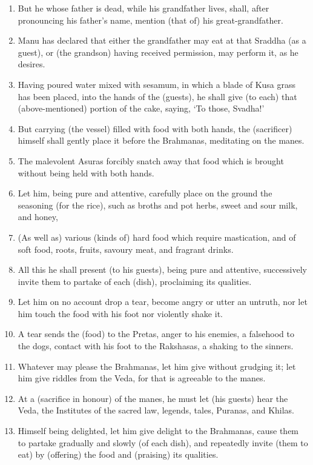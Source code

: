 \begin{enumerate}
\item But he whose father is dead, while his grandfather lives, shall, after pronouncing his father's name, mention (that of) his great-grandfather.
\item Manu has declared that either the grandfather may eat at that Sraddha (as a guest), or (the grandson) having received permission, may perform it, as he desires.
\item Having poured water mixed with sesamum, in which a blade of Kusa grass has been placed, into the hands of the (guests), he shall give (to each) that (above-mentioned) portion of the cake, saying, `To those, Svadha!'
\item But carrying (the vessel) filled with food with both hands, the (sacrificer) himself shall gently place it before the Brahmanas, meditating on the manes.
\item The malevolent Asuras forcibly snatch away that food which is brought without being held with both hands.
\item Let him, being pure and attentive, carefully place on the ground the seasoning (for the rice), such as broths and pot herbs, sweet and sour milk, and honey,
\item (As well as) various (kinds of) hard food which require mastication, and of soft food, roots, fruits, savoury meat, and fragrant drinks.
\item All this he shall present (to his guests), being pure and attentive, successively invite them to partake of each (dish), proclaiming its qualities.
\item Let him on no account drop a tear, become angry or utter an untruth, nor let him touch the food with his foot nor violently shake it.
\item A tear sends the (food) to the Pretas, anger to his enemies, a falsehood to the dogs, contact with his foot to the Rakshasas, a shaking to the sinners.
\item Whatever may please the Brahmanas, let him give without grudging it; let him give riddles from the Veda, for that is agreeable to the manes.
\item At a (sacrifice in honour) of the manes, he must let (his guests) hear the Veda, the Institutes of the sacred law, legends, tales, Puranas, and Khilas.
\item Himself being delighted, let him give delight to the Brahmanas, cause them to partake gradually and slowly (of each dish), and repeatedly invite (them to eat) by (offering) the food and (praising) its qualities.

\end{enumerate}
